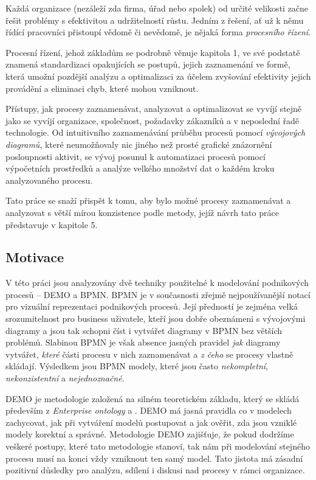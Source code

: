 Každá organizace (nezáleží zda firma, úřad nebo spolek) od určité velikosti začne řešit problémy s efektivitou a udržitelností růstu. Jedním z řešení, ať už k němu řídící pracovníci přistoupí vědomě či nevědomě, je nějaká forma \textit{procesního řízení}.

Procesní řízení, jehož základům se podrobně věnuje kapitola 1, ve své podstatě znamená standardizaci opakujících se postupů, jejich zaznamenání ve formě, která umožní pozdější analýzu a optimalizaci za účelem zvyšování efektivity jejich provádění a eliminaci chyb, které mohou vzniknout.

Přístupy, jak procesy zaznamenávat, analyzovat a optimalizovat se vyvíjí stejně jako se vyvíjí organizace, společnost, požadavky zákazníků a v neposlední řadě technologie. Od intuitivního zaznamenávání průběhu procesů pomocí \textit{vývojových diagramů}, které neumožňovaly nic jiného než prosté grafické znázornění posloupnosti aktivit, se vývoj posunul k automatizaci procesů pomocí výpočetních prostředků a analýze velkého množství dat o každém kroku analyzovaného procesu.

Tato práce se snaží přispět k tomu, aby bylo možné procesy zaznamenávat a analyzovat s větší mírou konzistence podle metody, jejíž návrh tato práce představuje v kapitole 5.

\subsection{Motivace}
V této práci jsou analyzovány dvě techniky použitelné k modelování podnikových procesů – DEMO a BPMN. BPMN je v současnosti zřejmě nejpoužívanější notací pro vizuální reprezentaci podnikových procesů. Její předností je zejména velká srozumitelnost pro business uživatele, kteří jsou dobře obeznámeni s vývojovými diagramy a jsou tak schopni číst i vytvářet diagramy v BPMN bez větších problémů. Slabinou BPMN je však absence jasných pravidel \textit{jak} diagramy vytvářet, \textit{které} části procesu v nich zaznamenávat a \textit{z čeho} se procesy vlastně skládají. Výsledkem jsou BPMN modely, které jsou často \textit{nekompletní}, \textit{nekonzistentní} a \textit{nejednoznačné}.

DEMO je metodologie založená na silném teoretickém základu, který se skládá především z \textit{Enterprise ontology} a \textit{\ptheory}. DEMO má jasná pravidla co v modelech zachycovat, jak při vytváření modelů postupovat a jak ověřit, zda jsou vzniklé modely korektní a správné. Metodologie DEMO zajišťuje, že pokud dodržíme veškeré postupy, které tato metodologie stanoví, tak nám při modelování stejného procesu musí na konci vždy vzniknout ten samý model. Tato jistota má zásadní pozitivní důsledky pro analýzu, sdílení i diskusi nad procesy v rámci organizace.

